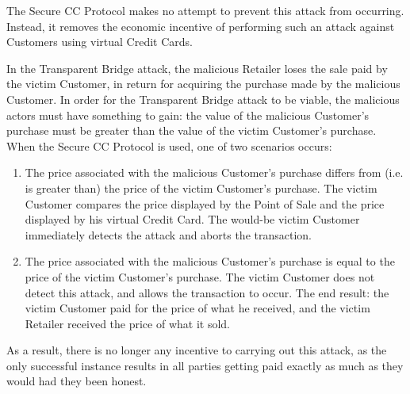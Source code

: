 The Secure CC Protocol makes no attempt to prevent this attack from occurring.
Instead, it removes the economic incentive of performing such an attack against Customers using virtual Credit Cards.

In the Transparent Bridge attack, the malicious Retailer loses the sale paid by the victim Customer, in return for acquiring the purchase made by the malicious Customer.
In order for the Transparent Bridge attack to be viable, the malicious actors must have something to gain:
  the value of the malicious Customer's purchase must be greater than the value of the victim Customer's purchase.
When the Secure CC Protocol is used, one of two scenarios occurs:

\begin{enumerate}
\item The price associated with the malicious Customer's purchase differs from (i.e. is greater than) the price of the victim Customer's purchase.
The victim Customer compares the price displayed by the Point of Sale and the price displayed by his virtual Credit Card.
The would-be victim Customer immediately detects the attack and aborts the transaction.
\item The price associated with the malicious Customer's purchase is equal to the price of the victim Customer's purchase.
The victim Customer does not detect this attack, and allows the transaction to occur.
The end result: the victim Customer paid for the price of what he received, and the victim Retailer received the price of what it sold.
\end{enumerate}

As a result, there is no longer any incentive to carrying out this attack, as the only successful instance results in all parties getting paid exactly as much as they would had they been honest.

